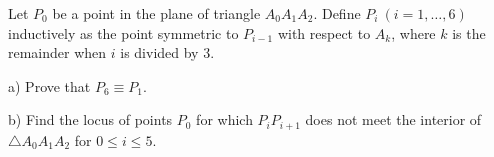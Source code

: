 Let $P_0$ be a point in the plane of triangle $A_0A_1A_2$. Define $P_i\ (i=1,\ldots ,6)$ inductively as the point symmetric to $P_{i-1}$ with respect to $A_k$, where $k$ is the remainder when $i$ is divided by $3$.

a) Prove that $P_6\equiv P_1$.

b) Find the locus of points $P_0$ for which $P_iP_{i+1}$ does not meet the interior of $\triangle A_0A_1A_2$ for $0\le i\le 5$.